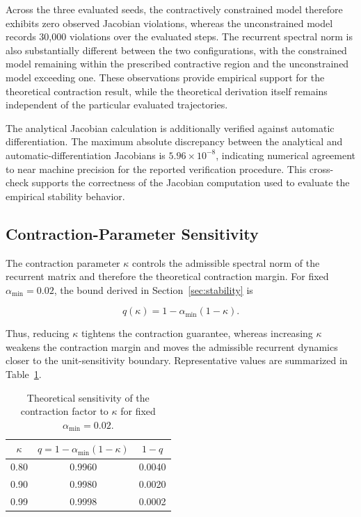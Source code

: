 \documentclass[journal]{IEEEtran}
\begin{document}
	Across the three evaluated seeds, the contractively constrained model therefore exhibits zero observed Jacobian violations, whereas the unconstrained model records 30,000 violations over the evaluated steps. The recurrent spectral norm is also substantially different between the two configurations, with the constrained model remaining within the prescribed contractive region and the unconstrained model exceeding one. These observations provide empirical support for the theoretical contraction result, while the theoretical derivation itself remains independent of the particular evaluated trajectories.
	
	The analytical Jacobian calculation is additionally verified against automatic differentiation. The maximum absolute discrepancy between the analytical and automatic-differentiation Jacobians is $5.96\times10^{-8}$, indicating numerical agreement to near machine precision for the reported verification procedure. This cross-check supports the correctness of the Jacobian computation used to evaluate the empirical stability behavior.
	
	
	\subsection{Contraction-Parameter Sensitivity}
	\label{subsec:kappa_sensitivity}
	
	The contraction parameter $\kappa$ controls the admissible spectral norm
	of the recurrent matrix and therefore the theoretical contraction margin.
	For fixed $\alpha_{\min}=0.02$, the bound derived in
	Section~\ref{sec:stability} is
	
	\begin{equation}
		q(\kappa)=1-\alpha_{\min}(1-\kappa).
	\end{equation}
	
	Thus, reducing $\kappa$ tightens the contraction guarantee, whereas
	increasing $\kappa$ weakens the contraction margin and moves the
	admissible recurrent dynamics closer to the unit-sensitivity boundary.
	Representative values are summarized in Table~\ref{tab:kappa_sensitivity}.
	
	\begin{table}[t]
		\centering
		\caption{Theoretical sensitivity of the contraction factor to $\kappa$
			for fixed $\alpha_{\min}=0.02$.}
		\label{tab:kappa_sensitivity}
		\begin{tabular}{ccc}
			\toprule
			$\kappa$ & $q=1-\alpha_{\min}(1-\kappa)$ & $1-q$ \\
			\midrule
			0.80 & 0.9960 & 0.0040 \\
			0.90 & 0.9980 & 0.0020 \\
			0.99 & 0.9998 & 0.0002 \\
			\bottomrule
		\end{tabular}
	\end{table}
	
\end{document}
